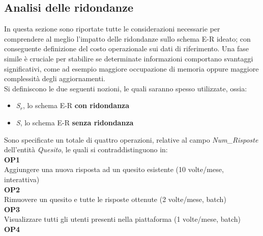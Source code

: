 \documentclass{article}
\begin{document}
\subsection{Analisi delle ridondanze}
\large
In questa sezione sono riportate tutte le considerazioni necessarie per comprendere al meglio l'impatto delle ridondanze sullo schema E-R ideato; con conseguente definizione del costo operazionale sui dati di riferimento. Una fase simile è cruciale per stabilire se determinate informazioni comportano svantaggi significativi, come ad esempio maggiore occupazione di memoria oppure maggiore complessità degli aggiornamenti.\vspace{7pt}\\
Si definiscono le due seguenti nozioni, le quali saranno spesso utilizzate, ossia:
\begin{itemize}[label={-}]
    \itemsep0em
    \item \textit{S$_r$}, lo schema E-R \textbf{con ridondanza}
    \item \textit{S}, \hspace{1px} lo schema E-R \textbf{senza ridondanza}
\end{itemize}
\vspace*{7pt}
Sono specificate un totale di quattro operazioni, relative al campo \textit{Num\_Risposte} dell'entità \textit{Quesito}, le quali si contraddistinguono in: \vspace*{7pt}\\
\hspace*{5pt}\textbf{OP1} \\
\hspace*{5pt}Aggiungere una nuova risposta ad un quesito esistente (10 volte/mese, interattiva) \vspace*{7pt}\\
\hspace*{5pt}\textbf{OP2} \\
\hspace*{5pt}Rimuovere un quesito e tutte le risposte ottenute (2 volte/mese, batch) \vspace*{7pt}\\
\hspace*{5pt}\textbf{OP3} \\
\hspace*{5pt}Visualizzare tutti gli utenti presenti nella piattaforma (1 volte/mese, batch) \vspace*{7pt}\\
\hspace*{5pt}\textbf{OP4} \\
\end{document}
